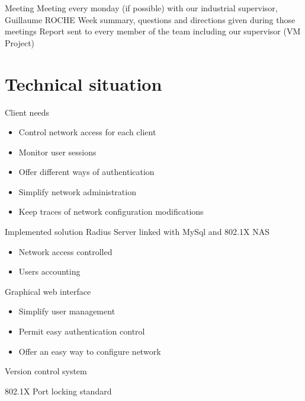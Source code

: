 \documentclass[12pt]{beamer}
\begin{document}
\begin{frame}{Meeting}
    Meeting every monday (if possible) with our industrial supervisor, Guillaume ROCHE
    \vfill
    Week summary, questions and directions given during those meetings
    \vfill
    Report sent to every member of the team including our supervisor (VM Project)
\end{frame}

\section{Technical situation}

\begin{frame}{Client needs}
    \begin{itemize}
	\item Control network access for each client
	\vfill
	\item Monitor user sessions
	\vfill 
	\item Offer different ways of authentication
	\vfill
	\item Simplify network administration
	\vfill
	\item Keep traces of network configuration modifications
    \end{itemize}
\end{frame}

\begin{frame}{Implemented solution}
    Radius Server linked with MySql and 802.1X NAS
    \begin{itemize}
	\item<1-2> Network access controlled
	\item<2> Users accounting
    \end{itemize}
    \vfill
    Graphical web interface
    \begin{itemize}
	\item<0> Simplify user management
	\item<0> Permit easy authentication control
	\item<0> Offer an easy way to configure network
    \end{itemize}
    \vfill
    Version control system
\end{frame}
	
\begin{frame}{802.1X}
    Port locking standard

\end{frame}
\end{document}

